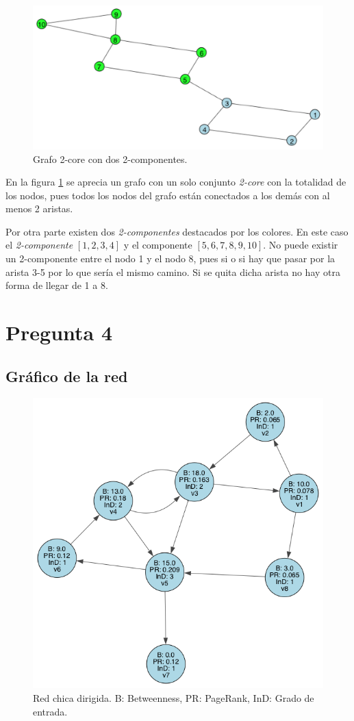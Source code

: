 \documentclass[letterpaper]{article}
\begin{document}
\begin{figure}[H]
  \centering
  \includegraphics[width=.6\linewidth]{img/p3.png}
  \caption{ Grafo 2-core con dos 2-componentes.}
  \label{red:3}
\end{figure}

En la figura \ref{red:3} se aprecia un grafo con un solo conjunto \textit{2-core} con la totalidad de los nodos, pues todos los nodos del grafo están conectados a los demás con al menos 2 aristas.

Por otra parte existen dos \textit{2-componentes} destacados por los colores. En este caso el \textit{2-componente} $\left[1,2,3,4\right]$ y el componente $\left[5,6,7,8,9,10\right]$. No puede existir un 2-componente entre el nodo 1 y el nodo 8, pues si o si hay que pasar por la arista 3-5 por lo que sería el mismo camino. Si se quita dicha arista no hay otra forma de llegar de 1 a 8.


\section{Pregunta 4}

\subsection{Gráfico de la red}
\begin{figure}[H]
  \centering
  \includegraphics[width=.5\linewidth]{img/p4-all.png}
  \caption{Red chica dirigida. B: Betweenness, PR: PageRank, InD: Grado de entrada.}
  \label{red:4}
\end{figure}
\end{document}
